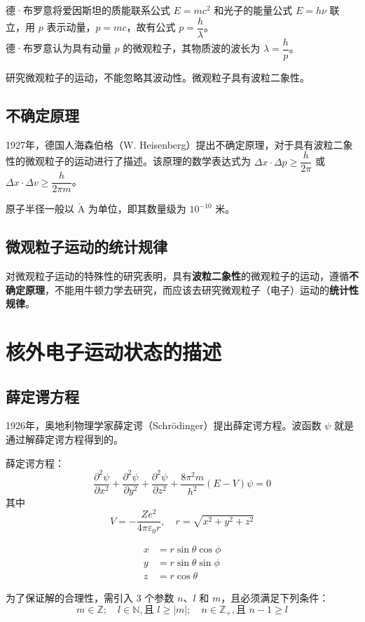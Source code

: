 德·布罗意将爱因斯坦的质能联系公式 $E=mc^2$ 和光子的能量公式 $E=h\nu$ 联立，用 $p$ 表示动量，$p=mc$，故有公式 $p=\dfrac{h}{\lambda}$。\\
德·布罗意认为具有动量 $p$ 的微观粒子，其物质波的波长为 $\lambda = \dfrac{h}{p}$。

研究微观粒子的运动，不能忽略其波动性。微观粒子具有波粒二象性。

\subsection{不确定原理}
1927年，德国人海森伯格（W. Heisenberg）提出不确定原理，对于具有波粒二象性的微观粒子的运动进行了描述。该原理的数学表达式为 $\Delta x \cdot \Delta p \geqslant \dfrac{h}{2\pi}$ 或 $\Delta x \cdot \Delta v \geqslant \dfrac{h}{2\pi m}$。

原子半径一般以 $\mathrm{\mathring{A}}$ 为单位，即其数量级为 $10^{-10}$ 米。

\subsection{微观粒子运动的统计规律}
对微观粒子运动的特殊性的研究表明，具有\textbf{波粒二象性}的微观粒子的运动，遵循\textbf{不确定原理}，不能用牛顿力学去研究，而应该去研究微观粒子（电子）运动的\textbf{统计性规律}。

\section{核外电子运动状态的描述}

\subsection{薛定谔方程}
1926年，奥地利物理学家薛定谔（Schrödinger）提出薛定谔方程。波函数 $\psi$ 就是通过解薛定谔方程得到的。

薛定谔方程：
\[
\dfrac{\partial^{2}\psi}{\partial x^{2}} + \dfrac{\partial^{2}\psi}{\partial y^{2}} + \dfrac{\partial^{2}\psi}{\partial z^{2}} + \dfrac{8\pi^{2}m}{h^{2}}(E - V)\psi = 0
\]
其中
\[
V = -\dfrac{Ze^2}{4\pi \varepsilon_{0} r}, \quad r = \sqrt{x^{2}+ y^{2}+ z^{2}}
\]

\[
\begin{aligned}
x &= r\sin\theta\cos\phi \\
y &= r\sin\theta\sin\phi \\
z &= r\cos\theta
\end{aligned}
\]

为了保证解的合理性，需引入 $3$ 个参数 $n$、$l$ 和 $m$，且必须满足下列条件：
\[
m \in \mathbb{Z}; \quad l \in \mathbb{N}, \text{且 } l \geqslant \left| m \right|; \quad n \in \mathbb{Z}_+, \text{且 } n - 1 \geqslant l
\]

